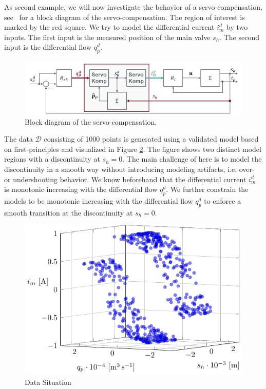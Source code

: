 As second example, we will now investigate the behavior of a servo-compensation, see~ for a block diagram of the servo-compensation. The region of interest is marked by the red square. We try to model the differential current $i_m^d$ by two inputs. The first input is the measured position of the main valve $s_h$. The second input is the differential flow $q_p^d$. 

\begin{figure}[H]
	\centering
	\includegraphics[width=0.8\columnwidth]{graphics/pgfplots/cha5/Bosch/blockschaltbild.png}
	\caption{Block diagram of the servo-compensation.}
	\label{fig:blockschaltbild}
\end{figure}

The data $\mathcal{D}$ consisting of 1000 points is generated using a validated model based on first-principles and visualized in Figure \ref{fig:bosch_data_situation}. The figure shows two distinct model regions with a discontinuity at $s_h = 0$. The main challenge of here is to model the discontinuity in a smooth way without introducing modeling artifacts, i.e. over- or undershooting behavior. We know beforehand that the differential current $i_m^d$ is monotonic increasing with the differential flow $q_p^d$. We further constrain the models to be monotonic increasing with the differential flow $q_p^d$ to enforce a smooth transition at the discontinuity at $s_h = 0$.

\begin{figure}[H]
	\centering
	\includegraphics{graphics/pgfplots/cha5/Bosch/data_situation.pdf} 
	\caption{Data Situation}
	\label{fig:bosch_data_situation}
\end{figure}

